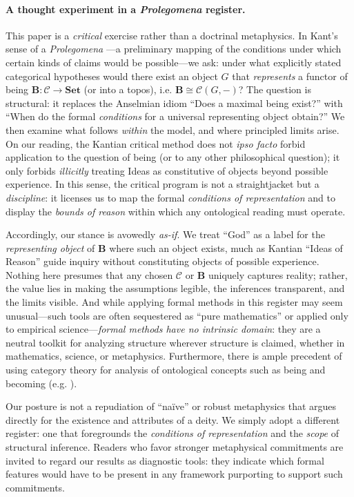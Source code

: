 \documentclass[11pt]{article}
\theoremstyle{upright}
\begin{document}
\paragraph{A thought experiment in a \emph{Prolegomena} register.}
This paper is a \emph{critical} exercise rather than a doctrinal metaphysics. In Kant’s sense of a \emph{Prolegomena} \citep{Kant1998}—a preliminary mapping of the conditions under which certain kinds of claims would be possible—we ask: under what explicitly stated categorical hypotheses would there exist an object \(G\) that \emph{represents} a functor of being \(\mathbf B:\mathcal C\to\mathbf{Set}\) (or into a topos), i.e. \(\mathbf B\cong \mathcal C(G,-)\)? The question is structural: it replaces the Anselmian idiom “Does a maximal being exist?”  \citep{Anselm1965} with “When do the formal \emph{conditions} for a universal representing object obtain?” We then examine what follows \emph{within} the model, and where principled limits arise. On our reading, the Kantian critical method does not \emph{ipso facto} forbid application to the question of being (or to any other philosophical question); it only forbids \emph{illicitly} treating Ideas as constitutive of objects beyond possible experience. In this sense, the critical program is not a straightjacket but a \emph{discipline}: it licenses us to map the formal \emph{conditions of representation} and to display the \emph{bounds of reason} within which any ontological reading must operate.

Accordingly, our stance is avowedly \emph{as-if}. We treat “God” as a label for the \emph{representing object} of \(\mathbf B\) where such an object exists, much as Kantian “Ideas of Reason” guide inquiry without constituting objects of possible experience. Nothing here presumes that any chosen \(\mathcal C\) or \(\mathbf B\) uniquely captures reality; rather, the value lies in making the assumptions legible, the inferences transparent, and the limits visible. And while applying formal methods in this register may seem unusual—such tools are often sequestered as “pure mathematics” or applied only to empirical science—\emph{formal methods have no intrinsic domain}: they are a neutral toolkit for analyzing structure wherever structure is claimed, whether in mathematics, science, or metaphysics. Furthermore, there is ample precedent of using category theory for analysis of ontological concepts such as being and becoming (e.g. \citep{Lawvere2005TCS}).

Our posture is not a repudiation of “naïve” or robust metaphysics that argues directly for the existence and attributes of a deity. We simply adopt a different register: one that foregrounds the \emph{conditions of representation} and the \emph{scope} of structural inference. Readers who favor stronger metaphysical commitments are invited to regard our results as diagnostic tools: they indicate which formal features would have to be present in any framework purporting to support such commitments. 
\end{document}
